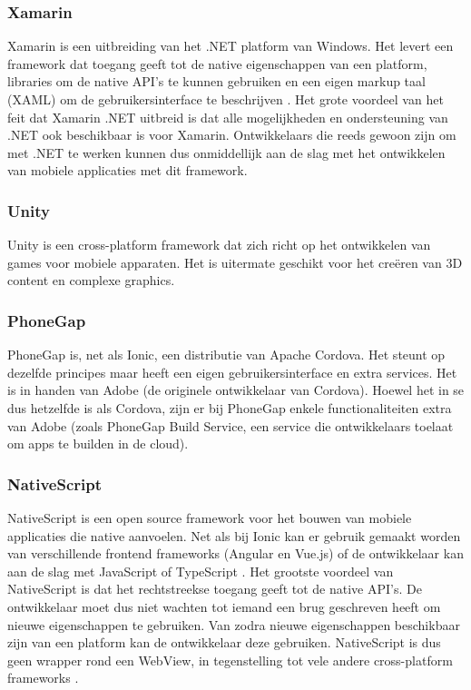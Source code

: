 \subsubsection{Xamarin}
\label{subsubsec:Xamarin}

Xamarin is een uitbreiding van het .NET platform van Windows. Het levert een framework dat toegang geeft tot de native eigenschappen van een platform, libraries om de native API's te kunnen gebruiken en een eigen markup taal (XAML) om de gebruikersinterface te beschrijven \autocite{Microsoft2020}. Het grote voordeel van het feit dat Xamarin .NET uitbreid is dat alle mogelijkheden en ondersteuning van .NET ook beschikbaar is voor Xamarin. Ontwikkelaars die reeds gewoon zijn om met .NET te werken kunnen dus onmiddellijk aan de slag met het ontwikkelen van mobiele applicaties met dit framework.

\subsubsection{Unity}
\label{subsubsec:Unity}

Unity is een cross-platform framework dat zich richt op het ontwikkelen van games voor mobiele apparaten. Het is uitermate geschikt voor het creëren van 3D content en complexe graphics. 

\subsubsection{PhoneGap}
\label{subsubsec:PhoneGap}

PhoneGap is, net als Ionic, een distributie van Apache Cordova. Het steunt op dezelfde principes maar heeft een eigen gebruikersinterface en extra services. Het is in handen van Adobe (de originele ontwikkelaar van Cordova). Hoewel het in se dus hetzelfde is als Cordova, zijn er bij PhoneGap enkele functionaliteiten extra van Adobe (zoals PhoneGap Build Service, een service die ontwikkelaars toelaat om apps te builden in de cloud).

\subsubsection{NativeScript} 
\label{subsubsec:NativeScript}

NativeScript is een open source framework voor het bouwen van mobiele applicaties die native aanvoelen. Net als bij Ionic kan er gebruik gemaakt worden van verschillende frontend frameworks (Angular en Vue.js) of de ontwikkelaar kan aan de slag met JavaScript of TypeScript \autocite{NativeScript2020}. Het grootste voordeel van NativeScript is dat het rechtstreekse toegang geeft tot de native API's. De ontwikkelaar moet dus niet wachten tot iemand een brug geschreven heeft om nieuwe eigenschappen te gebruiken. Van zodra nieuwe eigenschappen beschikbaar zijn van een platform kan de ontwikkelaar deze gebruiken. NativeScript is dus geen wrapper rond een WebView, in tegenstelling tot vele andere cross-platform frameworks \autocite{Anderson2016}.

